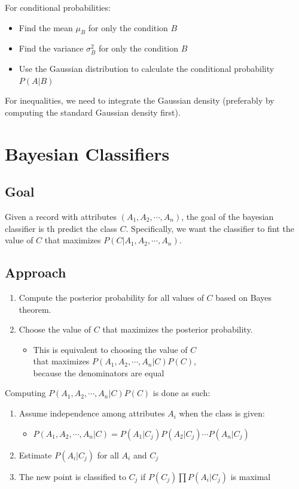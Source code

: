 For conditional probabilities:
\begin{itemize}
    \item Find the mean $\mu_B$ for only the condition $B$
    \item Find the variance $\sigma^2_B$ for only the condition $B$
    \item Use the Gaussian distribution to calculate the conditional probability $P(A|B)$
\end{itemize}
\medskip

For inequalities, we need to integrate the Gaussian density (preferably by computing the standard Gaussian density first).

\section{Bayesian Classifiers}
\subsection{Goal}
Given a record with attributes $(A_1, A_2, \cdots, A_n)$, the goal of the bayesian classifier is th predict the class $C$.
Specifically, we want the classifier to fint the value of $C$ that maximizes $P(C|A_1, A_2, \cdots, A_n)$.

\subsection{Approach}
\begin{enumerate}
    \item Compute the posterior probability for all values of $C$ based on Bayes theorem.
    \item Choose the value of $C$ that maximizes the posterior probability.
    \begin{itemize}
        \item This is equivalent to choosing the value of $C$ \\ that maximizes $P(A_1, A_2, \cdots, A_n | C) P(C)$, \\ because the denominators are equal
    \end{itemize}
\end{enumerate}
\medskip

Computing $P(A_1, A_2, \cdots, A_n | C) P(C)$ is done as such:
\begin{enumerate}
    \item Assume independence among attributes $A_i$ when the class is given:
    \begin{itemize}
        \item $P(A_1, A_2, \cdots, A_n | C) = P(A_1|C_j) P(A_2|C_j) \cdots P(A_n|C_j)$ 
    \end{itemize}
    \item Estimate $P(A_i|C_j)$ for all $A_i$ and $C_j$
    \item The new point is classified to $C_j$ if $P(C_j)\prod P(A_i|C_j)$ is maximal
\end{enumerate}

